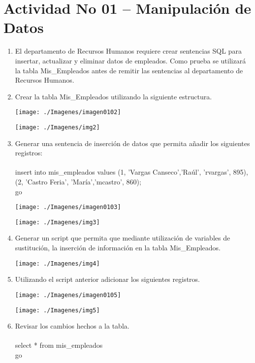 \section{Actividad No 01 – Manipulaci\'on de Datos} 

\begin{enumerate}[1.]
	\item El departamento de Recursos Humanos requiere crear sentencias SQL para insertar, actualizar y eliminar datos de empleados. Como prueba se utilizará la tabla Mis\_Empleados antes de remitir las sentencias al departamento de Recursos Humanos.

	\item Crear la tabla Mis\_Empleados utilizando la siguiente estructura.
	\begin{center}
	\texttt{[image: ./Imagenes/imagen0102]} 
	\end{center}
	\begin{center}
	\texttt{[image: ./Imagenes/img2]} 
	\end{center}
	\item Generar una sentencia de inserción de datos que permita añadir los siguientes registros:
	\\
	\\ insert into mis\_empleados values (1, 'Vargas Canseco','Raúl', 'rvargas', 895),(2, 'Castro Feria',  'María','mcastro', 860);
	\\ go

	\begin{center}
	\texttt{[image: ./Imagenes/imagen0103]} 
	\end{center}
	\begin{center}
	\texttt{[image: ./Imagenes/img3]} 
	\end{center}
	\item Generar un script que permita que mediante utilización de variables de sustitución, la inserción de información en la tabla Mis\_Empleados.
	\begin{center}
	\texttt{[image: ./Imagenes/img4]} 
	\end{center}
	\item Utilizando el script anterior adicionar los siguientes registros.
	\begin{center}
	\texttt{[image: ./Imagenes/imagen0105]} 
	\end{center}
	\begin{center}
	\texttt{[image: ./Imagenes/img5]} 
	\end{center}
	\item Revisar los cambios hechos a la tabla.
	\\
	\\ select * from mis\_empleados
	\\ go
	

\end{enumerate}
